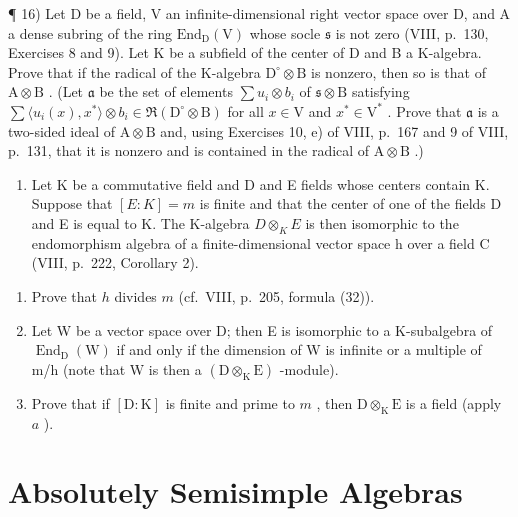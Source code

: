 ¶ 16) Let D be a field, V an infinite-dimensional right vector space over D, and A a dense subring of the ring \(\mathrm{End}_{\mathrm{D}}(\mathrm{V})\) whose socle \(\mathfrak{s}\) is not zero (VIII, p.~130, Exercises 8 and 9). Let K be a subfield of the center of D and B a K-algebra. Prove that if the radical of the K-algebra \(\mathrm{D}^{\circ} \otimes \mathrm{B}\) is nonzero, then so is that of \(\mathrm{A} \otimes \mathrm{B}\) . (Let \(\mathfrak{a}\) be the set of elements \(\sum u_{i} \otimes b_{i}\) of \(\mathfrak{s} \otimes \mathrm{B}\) satisfying \(\sum \langle u_{i}(x), x^{*} \rangle \otimes b_{i} \in \Re(\mathrm{D}^{\circ} \otimes \mathrm{B})\) for all \(x \in \mathrm{V}\) and \(x^{*} \in \mathrm{V}^{*}\) . Prove that \(\mathfrak{a}\) is a two-sided ideal of \(\mathrm{A} \otimes \mathrm{B}\) and, using Exercises 10, e) of VIII, p.~167 and 9 of VIII, p.~131, that it is nonzero and is contained in the radical of \(\mathrm{A} \otimes \mathrm{B}\) .)

\begin{enumerate}
\def\labelenumi{\arabic{enumi})}
\setcounter{enumi}{16}
\tightlist
\item
  Let K be a commutative field and D and E fields whose centers contain K. Suppose that \([E:K]=m\) is finite and that the center of one of the fields D and E is equal to K. The K-algebra \(D\otimes_{K}E\) is then isomorphic to the endomorphism algebra of a finite-dimensional vector space h over a field C (VIII, p.~222, Corollary 2).
\end{enumerate}

\begin{enumerate}
\def\labelenumi{\alph{enumi})}
\item
  Prove that \(h\) divides \(m\) (cf.~VIII, p.~205, formula (32)).
\item
  Let W be a vector space over D; then E is isomorphic to a K-subalgebra of \(\operatorname{End}_{\mathrm{D}}(\mathrm{W})\) if and only if the dimension of W is infinite or a multiple of m/h (note that W is then a \((\mathrm{D} \otimes_{\mathrm{K}} \mathrm{E})\) -module).
\item
  Prove that if \([\mathrm{D}:\mathrm{K}]\) is finite and prime to \(m\) , then \(\mathrm{D}\otimes_{\mathrm{K}}\mathrm{E}\) is a field (apply \(a\) ).
\end{enumerate}

\section{Absolutely Semisimple Algebras}

